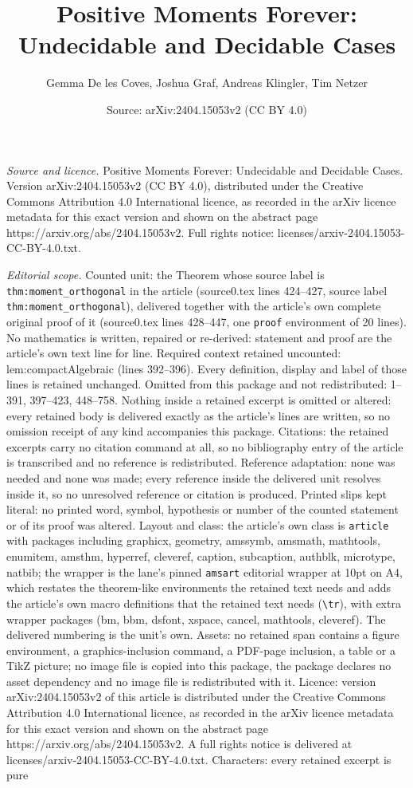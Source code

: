 \documentclass[10pt,a4paper]{amsart}
\title[Positive Moments Forever: Undecidable and Decidable Cases]{Positive Moments Forever: Undecidable and Decidable Cases}
\author{Gemma De les Coves, Joshua Graf, Andreas Klingler, Tim Netzer}
\date{Source: arXiv:2404.15053v2 (CC BY 4.0)}
\begin{document}
\maketitle

\noindent\emph{Source and licence.} Positive Moments Forever: Undecidable and Decidable Cases. Version arXiv:2404.15053v2 (CC BY 4.0), distributed under the Creative Commons Attribution 4.0 International licence, as recorded in the arXiv licence metadata for this exact version and shown on the abstract page https://arxiv.org/abs/2404.15053v2. Full rights notice: licenses/arxiv-2404.15053-CC-BY-4.0.txt.\par\smallskip

\noindent\textit{Editorial scope.} Counted unit: the Theorem whose source label is \texttt{thm:moment\_orthogonal} in the article (source0.tex lines 424--427, source label \texttt{thm:moment\_orthogonal}), delivered together with the article's own complete original proof of it (source0.tex lines 428--447, one \texttt{proof} environment of 20 lines). No mathematics is written, repaired or re-derived: statement and proof are the article's own text line for line. Required context retained uncounted: lem:compactAlgebraic (lines 392--396). Every definition, display and label of those lines is retained unchanged. Omitted from this package and not redistributed: 1--391, 397--423, 448--758. Nothing inside a retained excerpt is omitted or altered: every retained body is delivered exactly as the article's lines are written, so no omission receipt of any kind accompanies this package. Citations: the retained excerpts carry no citation command at all, so no bibliography entry of the article is transcribed and no reference is redistributed. Reference adaptation: none was needed and none was made; every reference inside the delivered unit resolves inside it, so no unresolved reference or citation is produced. Printed slips kept literal: no printed word, symbol, hypothesis or number of the counted statement or of its proof was altered. Layout and class: the article's own class is \texttt{article} with packages including graphicx, geometry, amssymb, amsmath, mathtools, enumitem, amsthm, hyperref, cleveref, caption, subcaption, authblk, microtype, natbib; the wrapper is the lane's pinned \texttt{amsart} editorial wrapper at 10pt on A4, which restates the theorem-like environments the retained text needs and adds the article's own macro definitions that the retained text needs (\texttt{\textbackslash tr}), with extra wrapper packages (bm, bbm, dsfont, xspace, cancel, mathtools, cleveref). The delivered numbering is the unit's own. Assets: no retained span contains a figure environment, a graphics-inclusion command, a PDF-page inclusion, a table or a TikZ picture; no image file is copied into this package, the package declares no asset dependency and no image file is redistributed with it. Licence: version arXiv:2404.15053v2 of this article is distributed under the Creative Commons Attribution 4.0 International licence, as recorded in the arXiv licence metadata for this exact version and shown on the abstract page https://arxiv.org/abs/2404.15053v2. A full rights notice is delivered at licenses/arxiv-2404.15053-CC-BY-4.0.txt. Characters: every retained excerpt is pure 
\end{document}
